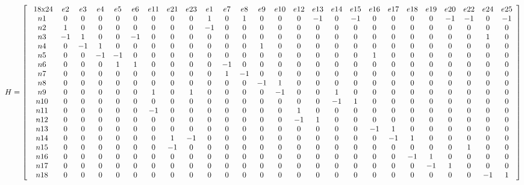 \begin{sidewaysfigure}[htb]
\begin{equation}
  \label{graph_nodes}
H
=
\left[
\begin{array}{*{26}c}
   $ 18x24$ & e2 & e3 & e4 & e5 & e6 & e11 & e21 & e23 & e1 & e7 & e8 & e9 & e10 & e12 & e13 & e14 & e15 & e16 & e17 & e18 & e19 & e20 & e22 & e24 & 
e25 \\
n1 & 0 & 0 & 0 & 0 & 0 & 0 & 0 & 0 & 1 & 0 & 1 & 0 & 0 & 0 & -1 & 0 & -1 & 0 & 0 & 0 & 0 & -1 & -1 & 0 & -1 
\\
n2 & 1 & 0 & 0 & 0 & 0 & 0 & 0 & 0 & -1 & 0 & 0 & 0 & 0 & 0 & 0 & 0 & 0 & 0 & 0 & 0 & 0 & 0 & 0 & 0 & 0 
\\
n3 & -1 & 1 & 0 & 0 & -1 & 0 & 0 & 0 & 0 & 0 & 0 & 0 & 0 & 0 & 0 & 0 & 0 & 0 & 0 & 0 & 0 & 0 & 0 & 1 & 0 
\\
n4 & 0 & -1 & 1 & 0 & 0 & 0 & 0 & 0 & 0 & 0 & 0 & 1 & 0 & 0 & 0 & 0 & 0 & 0 & 0 & 0 & 0 & 0 & 0 & 0 & 0
\\
n5 & 0 & 0 & -1 & -1 & 0 & 0 & 0 & 0 & 0 & 0 & 0 & 0 & 0 & 0 & 0 & 0 & 0 & 1 & 0 & 0 & 0 & 0 & 0 & 0 & 0 
\\
n6 & 0 & 0 & 0 & 1 & 1 & 0 & 0 & 0 & 0 & -1 & 0 & 0 & 0 & 0 & 0 & 0 & 0 & 0 & 0 & 0 & 0 & 0 & 0 & 0 & 
0 \\
n7 & 0 & 0 & 0 & 0 & 0 & 0 & 0 & 0 & 0 & 1 & -1 & 0 & 0 & 0 & 0 & 0 & 0 & 0 & 0 & 0 & 0 & 0 & 0 & 0 & 0 
\\
n8 & 0 & 0 & 0 & 0 & 0 & 0 & 0 & 0 & 0 & 0 & 0 & -1 & 1 & 0 & 0 & 0 & 0 & 0 & 0 & 0 & 0 & 0 & 0 & 0 & 0 
\\
n9 & 0 & 0 & 0 & 0 & 0 & 1 & 0 & 1 & 0 & 0 & 0 & 0 & -1 & 0 & 0 & 1 & 0 & 0 & 0 & 0 & 0 & 0 & 0 & 0 & 0 
\\
n10 & 0 & 0 & 0 & 0 & 0 & 0 & 0 & 0 & 0 & 0 & 0 & 0 & 0 & 0 & 0 & -1 & 1 & 0 & 0 & 0 & 0 & 0 & 0 & 0 & 
0\\
n11 & 0 & 0 & 0 & 0 & 0 & -1 & 0 & 0 & 0 & 0 & 0 & 0 & 0 & 1 & 0 & 0 & 0 & 0 & 0 & 0 & 0 & 0 & 0 & 0 & 0 
\\
n12 & 0 & 0 & 0 & 0 & 0 & 0 & 0 & 0 & 0 & 0 & 0 & 0 & 0 & -1 & 1 & 0 & 0 & 0 & 0 & 0 & 0 & 0 & 0 & 0 & 0 
\\
n13  &  0 & 0 & 0 & 0 & 0 & 0 & 0 & 0 & 0 & 0 & 0 & 0 & 0 & 0 & 0 & 0 & 0 & -1 & 1 & 0 & 0 & 0 & 0 & 0 & 0 
\\
n14 & 0 & 0 & 0 & 0 & 0 & 0 & 1 & -1 & 0 & 0 & 0 & 0 & 0 & 0 & 0 & 0 & 0 & 0 & -1 & 1 & 0 & 0 & 0 & 0 & 0 
\\
n15 & 0 & 0 & 0 & 0 & 0 & 0 & -1 & 0 & 0 & 0 & 0 & 0 & 0 & 0 & 0 & 0 & 0 & 0 & 0 & 0 & 0 & 0 & 1 & 0 & 0 
\\
n16 & 0 & 0 & 0 & 0 & 0 & 0 & 0 & 0 & 0 & 0 & 0 & 0 & 0 & 0 & 0 & 0 & 0 & 0 & 0 & -1 & 1 & 0 & 0 & 0 & 0 
\\
n17 & 0 & 0 & 0 & 0 & 0 & 0 & 0 & 0 & 0 & 0 & 0 & 0 & 0 & 0 & 0 & 0 & 0 & 0 & 0 & 0 & -1 & 1 & 0 & 0 & 0 
\\
n18 & 0 & 0 & 0 & 0 & 0 & 0 & 0 & 0 & 0 & 0 & 0 & 0 & 0 & 0 & 0 & 0 & 0 & 0 & 0 & 0 & 0 & 0 & 0 & -1 & 1 


\end{array}
\right]
\end{equation}
\end{sidewaysfigure}



